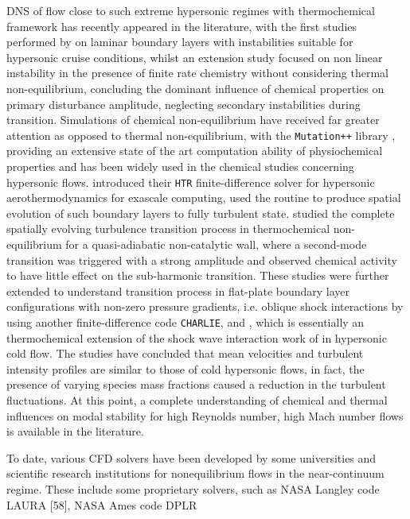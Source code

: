 \gls{DNS} of flow close to such extreme hypersonic regimes with thermochemical framework has recently appeared in the literature, with the first studies performed by \cite{marxen2013} on laminar boundary layers with instabilities suitable for hypersonic cruise conditions, whilst an extension study \citep{marxeniaccarinomagin2014} focused on non linear instability in the presence of finite rate chemistry without considering thermal non-equilibrium, concluding the dominant influence of chemical properties on primary disturbance amplitude, neglecting secondary instabilities during transition. Simulations of chemical non-equilibrium have received far greater attention as opposed to thermal non-equilibrium, with the \texttt{Mutation++} library \cite{Scoggins2020}, providing an extensive state of the art computation ability of physiochemical properties and has been widely used in the chemical studies concerning hypersonic flows. \cite{DiRenzo2020} introduced their \texttt{HTR} finite-difference solver for hypersonic aerothermodynamics for exascale computing, \cite{direnzourzay2021} used the routine to produce spatial evolution of such boundary layers to fully turbulent state. \cite{Passiatore2021} studied the complete spatially evolving turbulence transition process in thermochemical non-equilibrium for a quasi-adiabatic non-catalytic wall, where a second-mode transition was triggered with a strong amplitude and observed chemical activity to have little effect on the sub-harmonic transition. These studies were further extended to understand transition process in flat-plate boundary layer configurations with non-zero pressure gradients, i.e. oblique shock interactions by \citep{Volpiani2021} using another finite-difference code \texttt{CHARLIE}, and \cite{passiatore2023}, which is essentially an thermochemical extension of the shock wave interaction work of \cite{sandham2014} in hypersonic cold flow. The studies have concluded that mean velocities and turbulent intensity profiles are similar to those of cold hypersonic flows, in fact, the presence of varying species mass fractions caused a reduction in the turbulent fluctuations. At this point,  a complete understanding of chemical and thermal influences on modal stability for high Reynolds number, high Mach number flows is available in the literature. 



To date, various CFD solvers have been developed by some universities and scientific
research institutions for nonequilibrium flows in the near-continuum regime. These
include some proprietary solvers, such as NASA Langley code LAURA [58], NASA
Ames code DPLR

